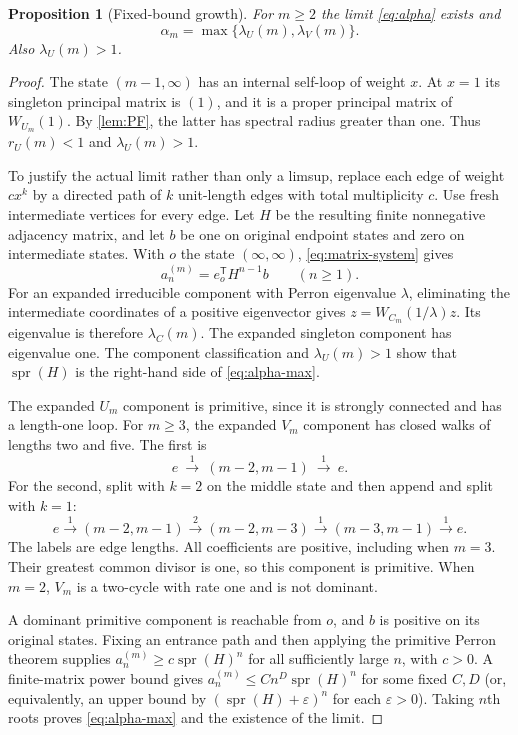 \documentclass[11pt,a4paper]{article}
\newtheorem{proposition}[proposition]{Proposition}
\theoremstyle{definition}\newaliascnt{definition}{theorem}
\theoremstyle{remark}\newaliascnt{remark}{theorem}
\newcommand{\spr}{\operatorname{spr}}
\newcommand{\eps}{\varepsilon}
\begin{document}
\begin{proposition}[Fixed-bound growth]\label{prop:growth}
For $m\ge2$ the limit \eqref{eq:alpha} exists and
\begin{equation}
 \alpha_m=\max\{\lambda_U(m),\lambda_V(m)\}.
 \label{eq:alpha-max}
\end{equation}
Also $\lambda_U(m)>1$.
\end{proposition}
\begin{proof}
The state $(m-1,\infty)$ has an internal self-loop of weight $x$.
At $x=1$ its singleton principal matrix is $(1)$, and it is a proper
principal matrix of $W_{U_m}(1)$. By \cref{lem:PF}, the latter has spectral
radius greater than one. Thus $r_U(m)<1$ and $\lambda_U(m)>1$.

To justify the actual limit rather than only a limsup, replace each edge
of weight $c x^k$ by a directed path of $k$ unit-length edges with total
multiplicity $c$. Use fresh intermediate vertices for every edge. Let $H$
be the resulting finite nonnegative adjacency matrix, and let $b$ be one
on original endpoint states and zero on intermediate states. With $o$ the
state $(\infty,\infty)$, \eqref{eq:matrix-system} gives
\[
 a_n^{(m)}=e_o^{\mathsf T}H^{n-1}b\qquad(n\ge1).
\]
For an expanded irreducible component with Perron eigenvalue $\lambda$,
eliminating the intermediate coordinates of a positive eigenvector gives
$z=W_{C_m}(1/\lambda)z$. Its eigenvalue is therefore $\lambda_C(m)$.
The expanded singleton component has eigenvalue one. The component
classification and $\lambda_U(m)>1$ show that $\spr(H)$ is the right-hand
side of \eqref{eq:alpha-max}.

The expanded $U_m$ component is primitive, since it is strongly connected
and has a length-one loop. For $m\ge3$, the expanded $V_m$ component has
closed walks of lengths two and five. The first is
\[
 e\ \xrightarrow{1}\ (m-2,m-1)\ \xrightarrow{1}\ e.
\]
For the second, split with $k=2$ on the middle state and then append and
split with $k=1$:
\[
 e\xrightarrow{1}(m-2,m-1)
 \xrightarrow{2}(m-2,m-3)
 \xrightarrow{1}(m-3,m-1)
 \xrightarrow{1}e.
\]
The labels are edge lengths. All coefficients are positive, including
when $m=3$. Their greatest common divisor is one, so this component is
primitive. When $m=2$, $V_m$ is a two-cycle with rate one and is not dominant.

A dominant primitive component is reachable from $o$, and $b$ is positive
on its original states. Fixing an entrance path and then applying the
primitive Perron theorem supplies $a_n^{(m)}\ge c\spr(H)^n$ for all
sufficiently large $n$, with $c>0$. A finite-matrix power bound gives
$a_n^{(m)}\le C n^D\spr(H)^n$ for some fixed $C,D$ (or, equivalently, an
upper bound by $(\spr(H)+\eps)^n$ for each $\eps>0$).
Taking $n$th roots proves \eqref{eq:alpha-max} and the existence of the limit.
\end{proof}
\end{document}
